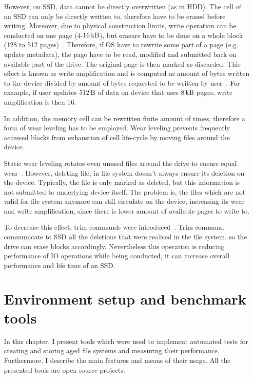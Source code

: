 \documentclass[
  color, %
  table, %
  lof,   %
  lot,   %
]{fithesis3}
\begin{document}
However, on SSD, data cannot be directly overwritten (as in HDD). The cell of an SSD can only be directly written to, therefore have to be erased before writing. Moreover, due to physical construction limits, write operation can be conducted on one page (4-$\SI{16}{\kilo\byte}$), but erasure have to be done on a whole block (128 to 512 pages)~\cite{Hu:2009:WAA:1534530.1534544}. Therefore, if OS have to rewrite some part of a page (e.g. update metadata), the page have to be read, modified and submitted back on available part of the drive. The original page is then marked as discarded. This effect is known as write amplification and is computed as amount of bytes written to the device divided by amount of bytes requested to be written by user~\cite{Hu:2009:WAA:1534530.1534544}. For example, if user updates $\SI{512}{\byte}$ of data on device that uses $\SI{8}{\kilo\byte}$ pages, write amplification is then 16.

In addition, the memory cell can be rewritten finite amount of times, therefore a form of wear leveling has to be employed. Wear leveling prevents frequently accessed blocks from exhaustion of cell life-cycle by moving files around the device.

Static wear leveling rotates even unused files around the drive to ensure equal wear~\cite{Chang:2007:EEF:1278480.1278533}. However, deleting file, in file system doesn't always ensure its deletion on the device. Typically, the file is only marked as deleted, but this information is not submitted to underlying device itself. The problem is, the files which are not valid for file system anymore can still circulate on the device, increasing its wear and write amplification, since there is lower amount of available pages to write to.

To decrease this effect, trim commands were introduced~\cite{Frankie:2012:MMT:2184512.2184527}. Trim command communicate to SSD all the deletions that were realised in the file system, so the drive can erase blocks accordingly. Nevertheless this operation is reducing performance of IO operations while being conducted, it can increase overall performance and life time of an SSD.



\chapter{Environment setup and benchmark tools}
\label{tools}
In this chapter, I present tools which were used to implement automated tests for creating and storing aged file systems and measuring their performance. Furthermore, I describe the main features and means of their usage. All the presented tools are open source projects.
\end{document}

